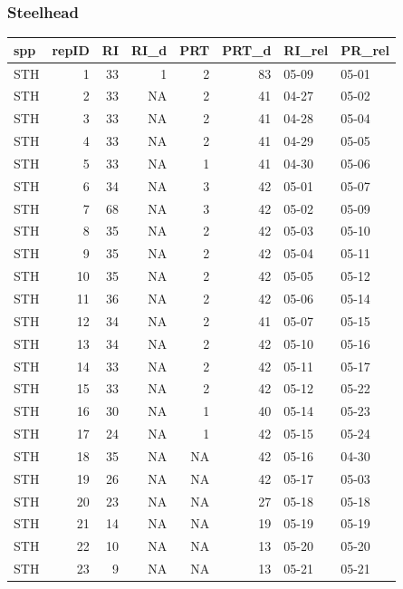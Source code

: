 \documentclass[
]{article}
\begin{document}
\subsubsection{Steelhead}\label{steelhead}

\begin{table}
\centering
\begin{tabular}[t]{l|r|r|r|r|r|l|l}
\hline
spp & repID & RI & RI\_d & PRT & PRT\_d & RI\_rel & PR\_rel\\
\hline
STH & 1 & 33 & 1 & 2 & 83 & 05-09 & 05-01\\
\hline
STH & 2 & 33 & NA & 2 & 41 & 04-27 & 05-02\\
\hline
STH & 3 & 33 & NA & 2 & 41 & 04-28 & 05-04\\
\hline
STH & 4 & 33 & NA & 2 & 41 & 04-29 & 05-05\\
\hline
STH & 5 & 33 & NA & 1 & 41 & 04-30 & 05-06\\
\hline
STH & 6 & 34 & NA & 3 & 42 & 05-01 & 05-07\\
\hline
STH & 7 & 68 & NA & 3 & 42 & 05-02 & 05-09\\
\hline
STH & 8 & 35 & NA & 2 & 42 & 05-03 & 05-10\\
\hline
STH & 9 & 35 & NA & 2 & 42 & 05-04 & 05-11\\
\hline
STH & 10 & 35 & NA & 2 & 42 & 05-05 & 05-12\\
\hline
STH & 11 & 36 & NA & 2 & 42 & 05-06 & 05-14\\
\hline
STH & 12 & 34 & NA & 2 & 41 & 05-07 & 05-15\\
\hline
STH & 13 & 34 & NA & 2 & 42 & 05-10 & 05-16\\
\hline
STH & 14 & 33 & NA & 2 & 42 & 05-11 & 05-17\\
\hline
STH & 15 & 33 & NA & 2 & 42 & 05-12 & 05-22\\
\hline
STH & 16 & 30 & NA & 1 & 40 & 05-14 & 05-23\\
\hline
STH & 17 & 24 & NA & 1 & 42 & 05-15 & 05-24\\
\hline
STH & 18 & 35 & NA & NA & 42 & 05-16 & 04-30\\
\hline
STH & 19 & 26 & NA & NA & 42 & 05-17 & 05-03\\
\hline
STH & 20 & 23 & NA & NA & 27 & 05-18 & 05-18\\
\hline
STH & 21 & 14 & NA & NA & 19 & 05-19 & 05-19\\
\hline
STH & 22 & 10 & NA & NA & 13 & 05-20 & 05-20\\
\hline
STH & 23 & 9 & NA & NA & 13 & 05-21 & 05-21\\
\hline
\end{tabular}
\end{table}
\end{document}
